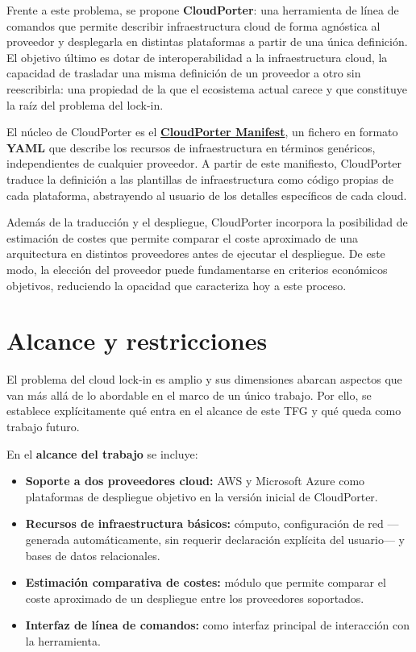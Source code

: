 Frente a este problema, se propone \textbf{CloudPorter}: una herramienta de línea de
comandos que permite describir infraestructura cloud de forma agnóstica al
proveedor y desplegarla en distintas plataformas a partir de una única definición.
El objetivo último es dotar de interoperabilidad a la infraestructura cloud,
la capacidad de trasladar una misma definición de un proveedor a otro sin reescribirla:
una propiedad de la que el ecosistema actual carece y que constituye la raíz del problema
del lock-in.

El núcleo de CloudPorter es el \hyperlink{cloudporter-manifest}{\textbf{CloudPorter Manifest}}, un fichero en formato
\textbf{YAML} que describe los recursos de infraestructura en términos genéricos, independientes de cualquier proveedor. A partir
de este manifiesto, CloudPorter traduce la definición a las plantillas de infraestructura
como código propias de cada plataforma, abstrayendo al usuario de los detalles
específicos de cada cloud.

Además de la traducción y el despliegue, CloudPorter incorpora la posibilidad de estimación
de costes que permite comparar el coste aproximado de una arquitectura en distintos
proveedores antes de ejecutar el despliegue. De este modo, la elección del proveedor
puede fundamentarse en criterios económicos objetivos, reduciendo la opacidad que
caracteriza hoy a este proceso.

\section{Alcance y restricciones}

El problema del cloud lock-in es amplio y sus dimensiones abarcan aspectos que van
más allá de lo abordable en el marco de un único trabajo. Por ello, se establece
explícitamente qué entra en el alcance de este TFG y qué queda como trabajo futuro.

En el \textbf{alcance del trabajo} se incluye:

\begin{itemize}
    \item \textbf{Soporte a dos proveedores cloud:} AWS y Microsoft Azure como
    plataformas de despliegue objetivo en la versión inicial de CloudPorter.

    \item \textbf{Recursos de infraestructura básicos:} cómputo, configuración
    de red —generada automáticamente, sin requerir declaración explícita del
    usuario— y bases de datos relacionales.

    \item \textbf{Estimación comparativa de costes:} módulo que permite comparar
    el coste aproximado de un despliegue entre los proveedores soportados.

    \item \textbf{Interfaz de línea de comandos:} como interfaz principal de
    interacción con la herramienta.
\end{itemize}

